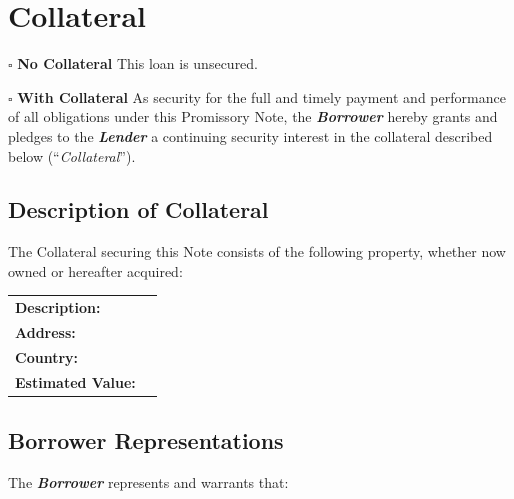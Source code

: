 
\section{Collateral}
\label{sec:collateral}

$\square$ \textbf{No Collateral}
This loan is unsecured.

\vspace{0.3cm}

\noindent $\square$ \textbf{With Collateral}
As security for the full and timely payment and performance of all obligations under this Promissory Note, the \textbf{\textit{Borrower}} hereby grants and pledges to the \textbf{\textit{Lender}} a continuing security interest in the collateral described below (“\textit{Collateral}”).

\subsection*{Description of Collateral}
The Collateral securing this Note consists of the following property, whether now owned or hereafter acquired:

\vspace{0.3cm}

\noindent
\begin{tabular}{p{6cm} p{10cm}}
\textbf{Description:} & \CollateralDescription{} \\ 
\textbf{Address:} & \CollateralAddress{} \\ 
\textbf{Country:} & \CollateralCountry{} \\ 
\textbf{Estimated Value:} & \CollateralEstimatedValue{} \\ 
\end{tabular}

\subsection*{Borrower Representations}
The \textbf{\textit{Borrower}} represents and warrants that:

